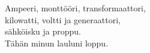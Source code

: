 
            Ampeeri, monttööri, transformaattori, \\
            kilowatti, voltti ja generaattori, \\
            sähköisku ja proppu. \\
            Tähän minun lauluni loppu. \\
